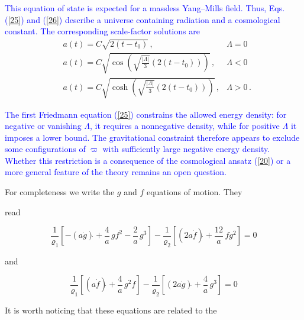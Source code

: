 \documentclass [prd,reprint,eqsecnum,nofootinbib]  {revtex4-1}
\newcommand{\corr}[1]{\textcolor{blue}{#1}}
\begin{document}
\corr{This equation of state is expected for a massless Yang--Mills
field. Thus, Eqs. (\ref{25}) and (\ref{26}) describe a universe
containing radiation and a cosmological constant. The corresponding
scale-factor solutions are}
\begin{align*}

 &a(t)= C \sqrt{2 (t-t_0)}\,, &\Lambda=0\\

 &a(t)= C \sqrt{\cos \left(\sqrt{\frac{|\Lambda|}{3} } \left(2 (t-t_0)\right)\right)}\,, &\Lambda<0\\

&a(t)= C \sqrt{\cosh \left(\sqrt{\frac{|\Lambda|}{3} } \left(2

(t-t_0)\right)\right)}\,, &\Lambda>0\,.

\end{align*}

\corr{The first Friedmann equation (\ref{25}) constrains the allowed
energy density: for negative or vanishing $\Lambda$, it requires a
nonnegative density, while for positive $\Lambda$ it imposes a lower
bound. The gravitational constraint therefore appears to exclude
some configurations of $\varpi$ with sufficiently large negative
energy density. Whether this restriction is a consequence of the
cosmological ansatz (\ref{20}) or a more general feature of the
theory remains an open question.}

For completeness we write the $g$ and $f$ equations of motion. They

read

\begin{equation}

\frac1{\varrho_1}\left[ -(a\dot g)\dot{} + \frac{4}a\, gf^2 -

\frac{2}a\, g^3\right] -\frac1{\varrho_2}\left[ (2a\dot f)\dot{} +

\frac{12}a\, fg^2 \right]=0\label{29}

\end{equation}

and

\begin{equation}

\frac1{\varrho_1}\left[ (a\dot f)\dot{} + \frac{4}a\, g^2f \right]

-\frac1{\varrho_2}\left[ (2a\dot g)\dot{} + \frac{4}a\, g^3

\right]=0\label{30}

\end{equation}

It is worth noticing that these equations are related to the
\end{document}
